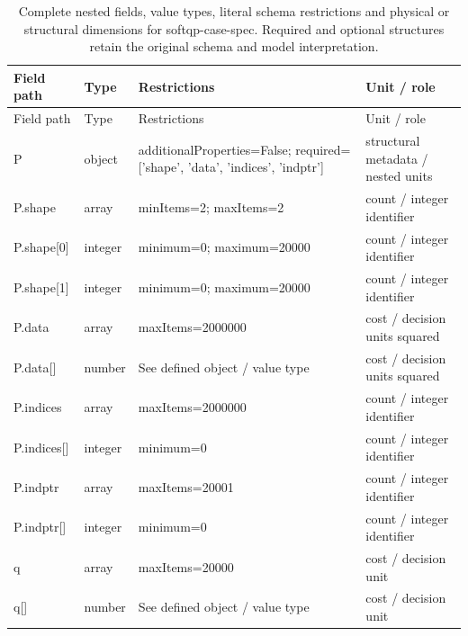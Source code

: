 \begingroup\footnotesize\setlength{\tabcolsep}{3pt}
\begin{longtable}{@{}>{\raggedright\arraybackslash}p{}>{\raggedright\arraybackslash}p{}>{\raggedright\arraybackslash}p{}>{\raggedright\arraybackslash}p{}@{}}
\caption{Complete nested fields, value types, literal schema restrictions and physical or structural dimensions for softqp-case-spec. Required and optional structures retain the original schema and model interpretation.}\label{tab:nested-softqp-case-spec}\\
\toprule Field path & Type & Restrictions & Unit / role\\\midrule\endfirsthead
\toprule Field path & Type & Restrictions & Unit / role\\\midrule\endhead
\bottomrule\endfoot
P & object & additionalProperties=\allowbreak{}False; required=\allowbreak{}['shape', 'data', 'indices', 'indptr'] & structural metadata /\allowbreak{} nested units\\
P.\allowbreak{}shape & array & minItems=\allowbreak{}2; maxItems=\allowbreak{}2 & count /\allowbreak{} integer identifier\\
P.\allowbreak{}shape[0] & integer & minimum=\allowbreak{}0; maximum=\allowbreak{}20000 & count /\allowbreak{} integer identifier\\
P.\allowbreak{}shape[1] & integer & minimum=\allowbreak{}0; maximum=\allowbreak{}20000 & count /\allowbreak{} integer identifier\\
P.\allowbreak{}data & array & maxItems=\allowbreak{}2000000 & cost /\allowbreak{} decision units squared\\
P.\allowbreak{}data[] & number & See defined object /\allowbreak{} value type & cost /\allowbreak{} decision units squared\\
P.\allowbreak{}indices & array & maxItems=\allowbreak{}2000000 & count /\allowbreak{} integer identifier\\
P.\allowbreak{}indices[] & integer & minimum=\allowbreak{}0 & count /\allowbreak{} integer identifier\\
P.\allowbreak{}indptr & array & maxItems=\allowbreak{}20001 & count /\allowbreak{} integer identifier\\
P.\allowbreak{}indptr[] & integer & minimum=\allowbreak{}0 & count /\allowbreak{} integer identifier\\
q & array & maxItems=\allowbreak{}20000 & cost /\allowbreak{} decision unit\\
q[] & number & See defined object /\allowbreak{} value type & cost /\allowbreak{} decision unit\\

\end{longtable}
